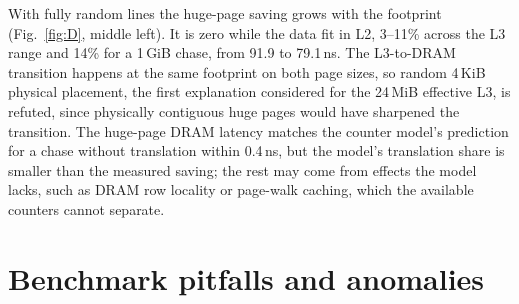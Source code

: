 \documentclass{article}
\begin{document}
With fully random lines the huge-page saving grows with the footprint (Fig.~\ref{fig:D}, middle left). It is zero while the data fit in L2, 3--11\% across the L3 range and 14\% for a 1\,GiB chase, from 91.9 to 79.1\,ns. The L3-to-DRAM transition happens at the same footprint on both page sizes, so random 4\,KiB physical placement, the first explanation considered for the 24\,MiB effective L3, is refuted, since physically contiguous huge pages would have sharpened the transition. The huge-page DRAM latency matches the counter model's prediction for a chase without translation within 0.4\,ns, but the model's translation share is smaller than the measured saving; the rest may come from effects the model lacks, such as DRAM row locality or page-walk caching, which the available counters cannot separate.

\section{Benchmark pitfalls and anomalies}\label{sec:pitan}
\end{document}
